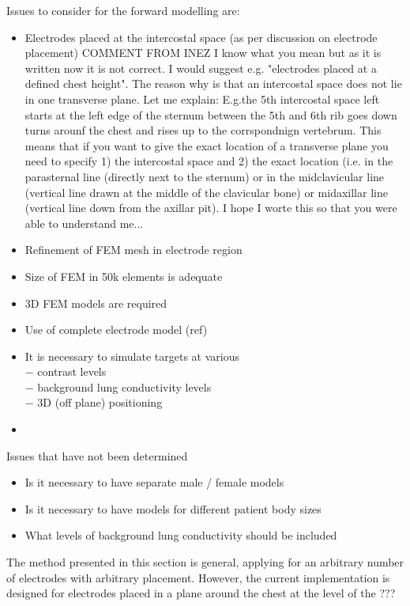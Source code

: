 \documentclass[12pt]{iopart}
\begin{document}
Issues to consider for the forward modelling are:
\begin{itemize}
\item
Electrodes placed at the intercostal space
(as per discussion on electrode placement)
COMMENT FROM INEZ
I know what you mean but as it is written now it is not correct. I would suggest e.g. "electrodes placed at a defined chest height". The reason why is that an intercostal space does not lie in one transverse plane. Let me explain: E.g.the 5th intercostal space left starts at the left edge of the sternum between the 5th and 6th rib goes down turns arounf the chest and rises up to the corrspondnign vertebrum. This means that if you want to give the exact location of a transverse plane you need to specify 1) the intercostal space and 2) the exact location (i.e. in the parasternal line (directly next to the sternum) or in the midclavicular line (vertical line drawn at the middle of the clavicular bone) or midaxillar line (vertical line down from the axillar pit). I hope I worte this so that you were able to understand me...
\item
Refinement of FEM mesh in electrode region
\item
Size of FEM in 50k elements is adequate
\item
3D FEM models are required
\item
Use of complete electrode model (ref)
\item
It is necessary to simulate targets at various
\\ $-$ contrast levels
\\ $-$ background lung conductivity levels
\\ $-$ 3D (off plane) positioning
\item
\end{itemize}

Issues that have not been determined
\begin{itemize}
\item
Is it necessary to have separate male / female models
\item
Is it necessary to have models for different patient body sizes
\item
What levels of background lung conductivity should be included
\end{itemize}


The method presented in this section is general,
applying for an arbitrary number of electrodes  with 
arbitrary placement. However, the current implementation
is designed for electrodes placed in a plane around the
chest at the level of the ???
\end{document}
